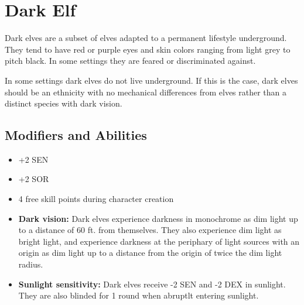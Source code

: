 \section{Dark Elf}\label{dark-elf}
Dark elves are a subset of elves adapted to a permanent lifestyle underground.
They tend to have red or purple eyes and skin colors ranging from light grey to
pitch black. In some settings they are feared or discriminated against.

In some settings dark elves do not live underground. If this is the case, dark
elves should be an ethnicity with no mechanical differences from elves rather
than a distinct species with dark vision.

\subsection*{Modifiers and Abilities}
\begin{itemize}
    \item +2 SEN
    \item +2 SOR
    \item 4 free skill points during character creation
    \item \textbf{Dark vision:} Dark elves experience darkness in monochrome as
        dim light up to a distance of 60 ft. from themselves. They also
        experience dim light as bright light, and experience darkness at the
        periphary of light sources with an origin as dim light up to a distance
        from the origin of twice the dim light radius.
    \item \textbf{Sunlight sensitivity:} Dark elves receive -2 SEN and -2 DEX
        in sunlight. They are also blinded for 1 round when abruptlt entering
        sunlight.
\end{itemize}
